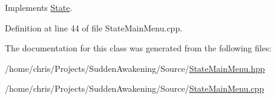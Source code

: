 Implements \hyperlink{class_state_a43d4ca30d927c023316c058b700c0716}{State}.



Definition at line 44 of file State\-Main\-Menu.\-cpp.



The documentation for this class was generated from the following files\-:\begin{DoxyCompactItemize}
\item 
/home/chris/\-Projects/\-Sudden\-Awakening/\-Source/\hyperlink{_state_main_menu_8hpp}{State\-Main\-Menu.\-hpp}\item 
/home/chris/\-Projects/\-Sudden\-Awakening/\-Source/\hyperlink{_state_main_menu_8cpp}{State\-Main\-Menu.\-cpp}\end{DoxyCompactItemize}
